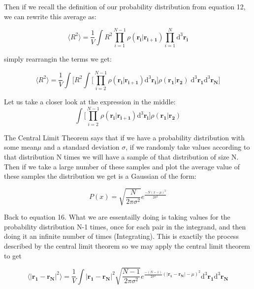 \documentclass{article}
\begin{document}
Then if we recall the definition of our probability distribution from equation 12, we can rewrite this average as:

\begin{equation}
\langle R^2 \rangle =\frac{1}{V} \int R^2  \prod\limits_{i=1}^{N-1}\rho(\mathbf{r_i}|\mathbf{r_{i+1}}) \prod\limits_{i=1}^N \mathrm{d}^3\mathbf{r_i}
\end{equation} 

simply rearrangin the terms we get:

\begin{equation}
\langle R^2 \rangle =\frac{1}{V} \int \bigg[ R^2  \int \Big[ \prod\limits_{i=2}^{N-1}\rho(\mathbf{r_i}|\mathbf{r_{i+1}}) \mathrm{d}^3\mathbf{r_i} \Big]\rho(\mathbf{r_1}|\mathbf{r_{2}})\; \mathrm{d}^3\mathbf{r_1} \mathrm{d}^3\mathbf{r_N}\bigg]
\end{equation}

Let us take a closer look at the expression in the middle: 
\begin{equation}
\int \Big[ \prod\limits_{i=2}^{N-1}\rho(\mathbf{r_i}|\mathbf{r_{i+1}}) \mathrm{d}^3\mathbf{r_i} \Big]\rho(\mathbf{r_1}|\mathbf{r_{2}})
\end{equation}

The Central Limit Theorem says that if we have a probability distribution with some mean\(\mu\) and a standard deviation \(\sigma\), if we randomly take values according to that distribution N times we will have a sample of that distribution of size N. Then if we take a large number of these samples and plot the average value of these samples the distribution we get is a Gaussian of the form:

\begin{equation}
P(x)=\sqrt{\frac{N}{2\pi \sigma^2}}e^{\frac{-N(x-\mu)^2}{2\sigma^2}}
\end{equation}

Back to equation 16. What we are essentailly doing is taking values for the probability distribution N-1 times, once for each pair in the integrand, and then doing it an infinite number of times (Integrating). This is exactily the process described by the central limit theorem so we may apply the central limit theorem to get 

\begin{equation}
\langle  |\mathbf{r_1-r_N}|^2 \rangle =\frac{1}{V} \int |\mathbf{r_1-r_N}|^2 \sqrt{\frac{N-1}{2\pi \sigma^2}}e^{\frac{-(N-1)}{2\sigma^2}( |\mathbf{r_1-r_N}|-\mu)^2} \mathrm{d}^3\mathbf{r_1} \mathrm{d}^3\mathbf{r_N}
\end{equation}
 
\end{document}
